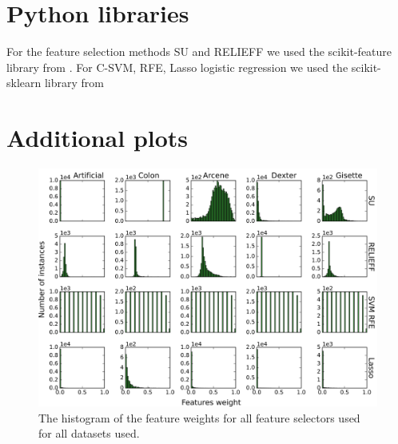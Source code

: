 \documentclass[twoside,11pt]{article}
\begin{document}
\vskip 0.2in


\newpage

\appendix
\label{appendix}
\section{Python libraries}
\label{apd:libraries}
For the feature selection methods SU and RELIEFF we used the scikit-feature library from \cite{Li-etal16}.
For C-SVM, RFE, Lasso logistic regression we used the scikit-sklearn library from \cite{scikit-learn}
\section{Additional plots}
\label{apd:plots}
\begin{figure}[h!]
  \centering
    \includegraphics[width=\textwidth]{images/feature_weights_hist.png}
  \caption{The histogram of the feature weights for all feature selectors used for all datasets used.}
  \label{fig:feature_weights_hist}
\end{figure}
\end{document}

